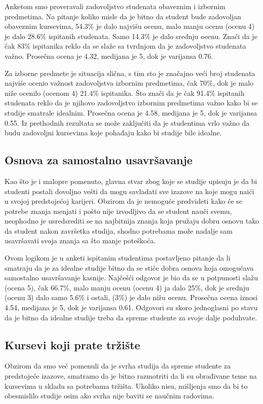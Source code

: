 \documentclass[a4paper]{article}
\begin{document}
{Anketom smo proveravali zadovoljstvo studenata obaveznim i izbornim predmetima. Na pitanje koliko misle da je bitno da student bude zadovoljan obaveznim kursevima, 54.3\% je dalo najvišu ocenu, malo manju ocenu (ocenu 4) je dalo 28.6\% ispitanih studenata. Samo  14.3\% je dalo srednju ocenu. Znači da je čak 83\% ispitanika reklo da se slaže sa tvrdnjom da je zadovoljstvo studenata važno. Prosečna ocena je 4.32, medijana je 5, dok je varijansa 0.76.

Za izborne predmete je situacija slična, s tim sto je značajno veći broj studenata najviše ocenio važnost zadovoljstva izbornim predmetima, čak 70\%, dok je malo niže ocenilo (ocenom 4) 21.4\% ispitanika. Što znači da je čak 91.4\% ispitanih studenata reklo da je njihovo zadovoljstvo izbornim predmetima važno kako bi se studije smatrale idealnim. Prosečna ocena je 4.58, medijana je 5, dok je varijansa 0.55. Iz prethodnih rezultata se može zaključiti da je studentima vrlo važno da budu zadovoljni kursevima koje pohađaju kako bi studije bile idealne.


\subsection{Osnova za samostalno usavršavanje}
\label{subsec:usavršavanje_stavovi}
Kao što je i malopre pomenuto, glavna stvar zbog koje se studije upisuju je da bi studenti postali dovoljno vešti da mogu savladati sve izazove na koje mogu naići u svojoj predstojećoj karijeri. Obzirom da je nemoguće predvideti kako će se potrebe znanja menjati i pošto nije izvodljivo da se student nauči svemu, neophodno je usredsrediti se na najbitnija znanja koja pružaju dobru osnovu tako da student nakon završetka studija, shodno potrebama može nadalje sam usavršavati svoja znanja sa što manje poteškoća.

Ovom logikom je u anketi ispitanim studentima postavljeno pitanje da li smatraju da je za idealne studije bitno da se stiče dobra osnova koja omogućava samostalno usavršavanje kasnije. Najčešći odgovor je bio da se u potpunosti slažu (ocena 5), čak 66.7\%, malo manju ocenu (ocenu 4) ja dalo 25\%, dok je srednju (ocenu 3) dalo samo 5.6\% i ostali, (3\%) je dalo nižu ocenu. Prosečna ocena iznosi 4.54, medijana je 5, dok je varijansa 0.61. Odgovori su skoro jednoglasni po stavu da je bitno da idealne studije treba da spreme studente za svoje dalje poduhvate. 

\subsection{Kursevi koji prate tržište}
\label{subsec:tržište_stavovi}
Obzirom da smo već pomenuli da je svrha studija da spreme studente za predstojeće izazove, smatramo da je bitno razmotriti da li su obrađivane teme na kursevima u skladu sa potrebama tržišta. Ukoliko nisu, mišljenja smo da bi to obesmislilo studije osim ako svrha nije baviti se naučnim radovima.

}
\end{document}
